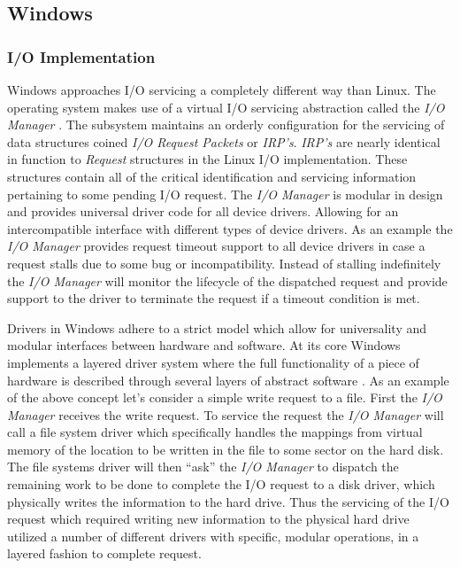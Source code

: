 \subsection{\bf Windows}

  \subsubsection{\bf I/O Implementation}
  \normalfont \indent Windows approaches I/O servicing a completely different way than Linux. The operating system makes use of a virtual I/O servicing abstraction called the \textit{I/O Manager} \cite{windowsInternals}. The subsystem maintains an orderly configuration for the servicing of data structures coined \textit{I/O Request Packets} or \textit{IRP’s}. \textit{IRP’s} are nearly identical in function to \textit{Request} structures in the Linux I/O implementation. These structures contain all of the critical identification and servicing information pertaining to some pending I/O request. The \textit{I/O Manager} is modular in design and provides universal driver code for all device drivers. Allowing for an intercompatible interface with different types of device drivers. As an example the \textit{I/O Manager} provides request timeout support to all device drivers in case a request stalls due to some bug or incompatibility. Instead of stalling indefinitely the \textit{I/O Manager} will monitor the lifecycle of the dispatched request and provide support to the driver to terminate the request if a timeout condition is met.

  \normalfont \indent Drivers in Windows adhere to a strict model which allow for universality and modular interfaces between hardware and software. At its core Windows implements a layered driver system where the full functionality of a piece of hardware is described through several layers of abstract software \cite{windowsInternals}. As an example of the above concept let's consider a simple write request to a file. First the \textit{I/O Manager} receives the write request. To service the request the \textit{I/O Manager} will call a file system driver which specifically handles the mappings from virtual memory of the location to be written in the file to some sector on the hard disk. The file systems driver will then “ask” the \textit{I/O Manager} to dispatch the remaining work to be done to complete the I/O request to a disk driver, which physically writes the information to the hard drive. Thus the servicing of the I/O request which required writing new information to the physical hard drive utilized a number of different drivers with specific, modular operations, in a layered fashion to complete request.

